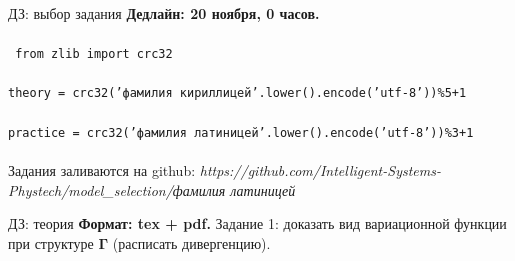 \documentclass[10pt,pdf,utf8,russian,aspectratio=169]{beamer}
\begin{document}
\begin{frame}{ДЗ: выбор задания}
\textbf{Дедлайн: 20 ноября, 0 часов.}\\~\\

\texttt{ from zlib import crc32}\\~\\
\texttt{theory = crc32('фамилия кириллицей'.lower().encode('utf-8'))\%5+1}\\~\\
\texttt{practice = crc32('фамилия латиницей'.lower().encode('utf-8'))\%3+1}\\~\\

Задания заливаются на github:
\textit{https://github.com/Intelligent-Systems-Phystech/model\_selection/фамилия латиницей}\\

\end{frame}


\begin{frame}{ДЗ: теория}
\textbf{Формат: tex + pdf.}
Задание 1: доказать вид вариационной функции при структуре $\boldsymbol{\Gamma}$ (расписать дивергенцию).
\end{frame}
\end{document}
